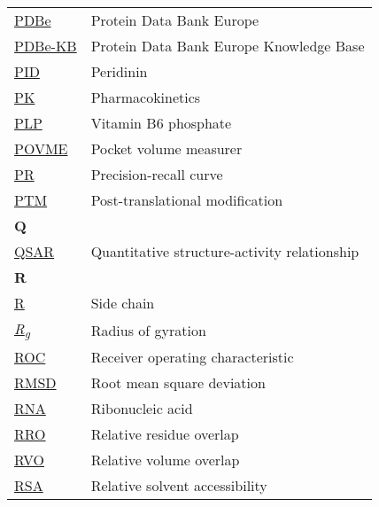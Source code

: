 \begin{longtable}[l]{@{}p{2.5cm}p{12cm}@{}}
\textmd{\href{https://www.ebi.ac.uk/pdbe/}{PDBe}} & Protein Data Bank Europe \\
\textmd{\href{https://www.ebi.ac.uk/pdbe/pdbe-kb/}{PDBe-KB}} & Protein Data Bank Europe Knowledge Base \\
\textmd{\href{https://www.ebi.ac.uk/pdbe-srv/pdbechem/chemicalCompound/show/PID}{PID}} & Peridinin \\
\textmd{\href{https://en.wikipedia.org/wiki/Pharmacokinetics}{PK}} & Pharmacokinetics \\
\textmd{\href{https://www.ebi.ac.uk/pdbe-srv/pdbechem/chemicalCompound/show/PLP}{PLP}} & Vitamin B6 phosphate \\
\textmd{\href{https://durrantlab.pitt.edu/povme2/}{POVME}} & Pocket volume measurer \\
\textmd{\href{https://en.wikipedia.org/wiki/Precision_and_recall}{PR}} & Precision-recall curve \\
\textmd{\href{https://en.wikipedia.org/wiki/Post-translational_modification}{PTM}} & Post-translational modification \\[0.3175cm]
\textbf{\large Q} & \\[0.25cm]
\textmd{\href{https://en.wikipedia.org/wiki/Quantitative_structure–activity_relationship}{QSAR}} & Quantitative structure-activity relationship \\[0.3175cm]
\textbf{\large R} & \\[0.25cm]
\textmd{\href{https://en.wikipedia.org/wiki/Amino_acid\#Side_chains}{R}} & Side chain \\
\textmd{\href{https://en.wikipedia.org/wiki/Radius_of_gyration}{\textit{R\textsubscript{g}}}} & Radius of gyration \\
\textmd{\href{https://en.wikipedia.org/wiki/Receiver_operating_characteristic}{ROC}} & Receiver operating characteristic \\
\textmd{\href{https://en.wikipedia.org/wiki/Root_mean_square_deviation}{RMSD}} & Root mean square deviation \\
\textmd{\href{https://en.wikipedia.org/wiki/RNA}{RNA}} & Ribonucleic acid \\
\textmd{\href{https://jcheminf.biomedcentral.com/articles/10.1186/s13321-024-00923-z}{RRO}} & Relative residue overlap \\
\textmd{\href{https://jcheminf.biomedcentral.com/articles/10.1186/s13321-024-00923-z}{RVO}} & Relative volume overlap \\
\textmd{\href{https://en.wikipedia.org/wiki/Relative_accessible_surface_area}{RSA}} & Relative solvent accessibility \\[0.3175cm]

\end{longtable}
